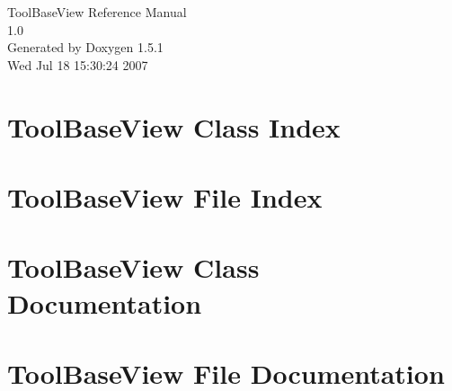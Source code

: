 \documentclass[a4paper]{book}
\begin{document}
\begin{titlepage}
\vspace*{7cm}
\begin{center}
{\Large Tool\-Base\-View Reference Manual\\[1ex]\large 1.0 }\\
\vspace*{1cm}
{\large Generated by Doxygen 1.5.1}\\
\vspace*{0.5cm}
{\small Wed Jul 18 15:30:24 2007}\\
\end{center}
\end{titlepage}
\clearemptydoublepage
{}
\tableofcontents
\clearemptydoublepage
{}
\chapter{Tool\-Base\-View Class Index}

\chapter{Tool\-Base\-View File Index}

\chapter{Tool\-Base\-View Class Documentation}



\chapter{Tool\-Base\-View File Documentation}

\printindex
\end{document}
